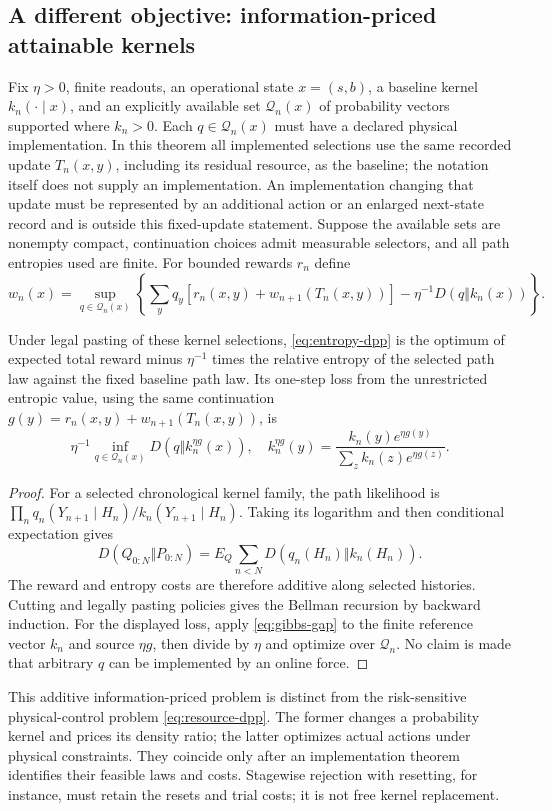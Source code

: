\subsection{A different objective: information-priced attainable kernels}
Fix $\eta>0$, finite readouts, an operational state $x=(s,b)$, a baseline kernel $k_n(\cdot\mid x)$, and an explicitly available set $\mathcal Q_n(x)$ of probability vectors supported where $k_n>0$. Each $q\in\mathcal Q_n(x)$ must have a declared physical implementation. In this theorem all implemented selections use the same recorded update $T_n(x,y)$, including its residual resource, as the baseline; the notation itself does not supply an implementation. An implementation changing that update must be represented by an additional action or an enlarged next-state record and is outside this fixed-update statement. Suppose the available sets are nonempty compact, continuation choices admit measurable selectors, and all path entropies used are finite. For bounded rewards $r_n$ define
\begin{equation}
 w_n(x)=\sup_{q\in\mathcal Q_n(x)}
 \left\{\sum_yq_y[r_n(x,y)+w_{n+1}(T_n(x,y))]
 -\eta^{-1}D(q\Vert k_n(x))\right\}.
 \label{eq:entropy-dpp}
\end{equation}

\begin{theorem}\label{thm:info-dpp}
Under legal pasting of these kernel selections, \eqref{eq:entropy-dpp} is the optimum of expected total reward minus $\eta^{-1}$ times the relative entropy of the selected path law against the fixed baseline path law. Its one-step loss from the unrestricted entropic value, using the same continuation $g(y)=r_n(x,y)+w_{n+1}(T_n(x,y))$, is
\[
 \eta^{-1}\inf_{q\in\mathcal Q_n(x)}D(q\Vert k_n^{\eta g}(x)),
 \quad k_n^{\eta g}(y)=\frac{k_n(y)e^{\eta g(y)}}{\sum_zk_n(z)e^{\eta g(z)}}.
\]
\end{theorem}
\begin{proof}
For a selected chronological kernel family, the path likelihood is $\prod_nq_n(Y_{n+1}\mid H_n)/k_n(Y_{n+1}\mid H_n)$. Taking its logarithm and then conditional expectation gives
\[
 D(Q_{0:N}\Vert P_{0:N})=E_Q\sum_{n<N}D(q_n(H_n)\Vert k_n(H_n)).
\]
The reward and entropy costs are therefore additive along selected histories. Cutting and legally pasting policies gives the Bellman recursion by backward induction. For the displayed loss, apply \eqref{eq:gibbs-gap} to the finite reference vector $k_n$ and source $\eta g$, then divide by $\eta$ and optimize over $\mathcal Q_n$. No claim is made that arbitrary $q$ can be implemented by an online force.
\end{proof}

This additive information-priced problem is distinct from the risk-sensitive physical-control problem \eqref{eq:resource-dpp}. The former changes a probability kernel and prices its density ratio; the latter optimizes actual actions under physical constraints. They coincide only after an implementation theorem identifies their feasible laws and costs. Stagewise rejection with resetting, for instance, must retain the resets and trial costs; it is not free kernel replacement.
\par
